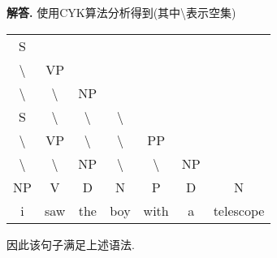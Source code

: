 \documentclass[11pt]{article}
\newenvironment{solution}{\par\noindent\textbf{解答. }}{\par}
\begin{document}
	\section{}
	\begin{solution}
		使用CYK算法分析得到(其中\textbackslash 表示空集)
		\begin{table}[htbp]
			\begin{tabular}{ccccccc}
			\cline{1-1}
			\multicolumn{1}{|c|}{S}                &                                       &                                       &                                       &                                       &                         &                        \\ \cline{1-2}
			\multicolumn{1}{|c|}{\textbackslash{}} & \multicolumn{1}{c|}{VP}               &                                       &                                       &                                       &                         &                        \\ \cline{1-3}
			\multicolumn{1}{|c|}{\textbackslash{}} & \multicolumn{1}{c|}{\textbackslash{}} & \multicolumn{1}{c|}{NP}               &                                       &                                       &                         &                        \\ \cline{1-4}
			\multicolumn{1}{|c|}{S}                & \multicolumn{1}{c|}{\textbackslash{}} & \multicolumn{1}{c|}{\textbackslash{}} & \multicolumn{1}{c|}{\textbackslash{}} &                                       &                         &                        \\ \cline{1-5}
			\multicolumn{1}{|c|}{\textbackslash{}} & \multicolumn{1}{c|}{VP}               & \multicolumn{1}{c|}{\textbackslash{}} & \multicolumn{1}{c|}{\textbackslash{}} & \multicolumn{1}{c|}{PP}               &                         &                        \\ \cline{1-6}
			\multicolumn{1}{|c|}{\textbackslash{}} & \multicolumn{1}{c|}{\textbackslash{}} & \multicolumn{1}{c|}{NP}               & \multicolumn{1}{c|}{\textbackslash{}} & \multicolumn{1}{c|}{\textbackslash{}} & \multicolumn{1}{c|}{NP} &                        \\ \hline
			\multicolumn{1}{|c|}{NP}               & \multicolumn{1}{c|}{V}                & \multicolumn{1}{c|}{D}                & \multicolumn{1}{c|}{N}                & \multicolumn{1}{c|}{P}                & \multicolumn{1}{c|}{D}  & \multicolumn{1}{c|}{N} \\ \hline
			i                                      & saw                                   & the                                   & boy                                   & with                                  & a                       & telescope             
			\end{tabular}
		\end{table}
		
		因此该句子满足上述语法.
	\end{solution}
\end{document}
